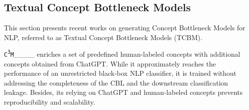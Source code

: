 \subsection{Textual Concept Bottleneck Models}
\label{related_work}
This section presents recent works on generating Concept Bottleneck Models for NLP, referred to  as Textual Concept Bottleneck Models (TCBM).

\texttt{C\textsuperscript{3}M}____ enriches a set of predefined human-labeled concepts with additional concepts obtained from ChatGPT. While it approximately reaches the performance of an unrestricted black-box NLP classifier, it is trained without addressing the completeness of the CBL and the downstream classification leakage. Besides, its relying on ChatGPT and human-labeled concepts prevents reproducibility and scalability.


